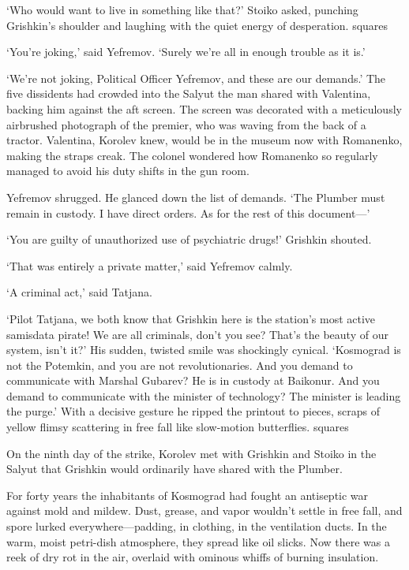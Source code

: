 `Who would want to live in something like that?' Stoiko asked, punching Grishkin's shoulder and laughing with the quiet energy of desperation.
squares

`You're joking,' said Yefremov. `Surely we're all in enough trouble as it is.'

`We're not joking, Political Officer Yefremov, and these are our demands.' The five dissidents had crowded into the Salyut the man shared with Valentina, backing him against the aft screen. The screen was decorated with a meticulously airbrushed photograph of the premier, who was waving from the back of a tractor. Valentina, Korolev knew, would be in the museum now with Romanenko, making the straps creak. The colonel wondered how Romanenko so regularly managed to avoid his duty shifts in the gun room.

Yefremov shrugged. He glanced down the list of demands. `The Plumber must remain in custody. I have direct orders. As for the rest of this document---'

`You are guilty of unauthorized use of psychiatric drugs!' Grishkin shouted.

`That was entirely a private matter,' said Yefremov calmly.

`A criminal act,' said Tatjana.

`Pilot Tatjana, we both know that Grishkin here is the station's most active samisdata pirate! We are all criminals, don't you see? That's the beauty of our system, isn't it?' His sudden, twisted smile was shockingly cynical. `Kosmograd is not the Potemkin, and you are not revolutionaries. And you demand to communicate with Marshal Gubarev? He is in custody at Baikonur. And you demand to communicate with the minister of technology? The minister is leading the purge.' With a decisive gesture he ripped the printout to pieces, scraps of yellow flimsy scattering in free fall like slow-motion butterflies.
squares

On the ninth day of the strike, Korolev met with Grishkin and Stoiko in the Salyut that Grishkin would ordinarily have shared with the Plumber.

For forty years the inhabitants of Kosmograd had fought an antiseptic war against mold and mildew. Dust, grease, and vapor wouldn't settle in free fall, and spore lurked everywhere---padding, in clothing, in the ventilation ducts. In the warm, moist petri-dish atmosphere, they spread like oil slicks. Now there was a reek of dry rot in the air, overlaid with ominous whiffs of burning insulation.

